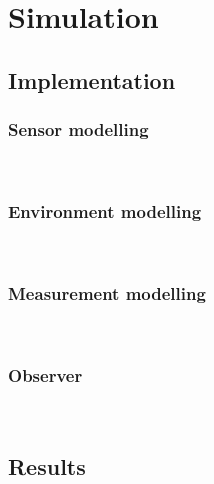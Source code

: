 \chapter{Simulation}
\section{Implementation}
\subsection{Sensor modelling}\\
\subsection{Environment modelling}\\
\subsection{Measurement modelling}\\
\subsection{Observer}\\
\section{Results}